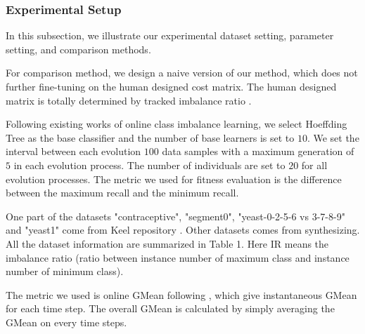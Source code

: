 \documentclass{article}
\begin{document}
\subsubsection{Experimental Setup}
In this subsection, we illustrate our experimental dataset setting, parameter setting, and comparison methods.

For comparison method, we design a naive version of our method, which does not further fine-tuning on the human designed cost matrix. The human designed matrix is totally determined by tracked imbalance ratio .

Following existing works of online class imbalance learning, we select Hoeffding Tree  as the base classifier and the number of base learners is set to $10$. We set the interval between each evolution $100$ data samples with a maximum generation of $5$ in each evolution process. The number of individuals are set to $20$ for all evolution processes. The metric we used for fitness evaluation is the difference between the maximum recall and the minimum recall.

One part of the datasets "contraceptive", "segment0", "yeast-0-2-5-6 vs 3-7-8-9" and "yeast1" come from Keel repository .
Other datasets comes from synthesizing. All the dataset information are summarized in Table 1. Here IR means the imbalance ratio (ratio between instance number of maximum class and instance number of minimum class).

The metric we used is online GMean following , which give instantaneous GMean for each time step. The overall GMean is calculated by simply averaging the GMean on every time steps.
\end{document}
